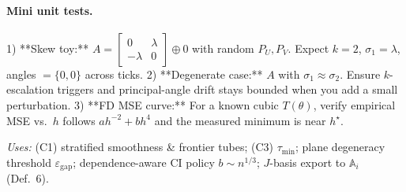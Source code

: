 \paragraph{Mini unit tests.}
1) **Skew toy:** \(A=\begin{bmatrix}0&\lambda\\-\lambda&0\end{bmatrix}\oplus 0\) with random \(P_U,P_V\). Expect \(k\!=\!2\), \(\sigma_1=\lambda\), angles \(=\{0,0\}\) across ticks.  
2) **Degenerate case:** \(A\) with \(\sigma_1\approx\sigma_2\). Ensure \(k\)-escalation triggers and principal-angle drift stays bounded when you add a small perturbation.  
3) **FD MSE curve:** For a known cubic \(T(\theta)\), verify empirical MSE vs.\ \(h\) follows \(a h^{-2} + b h^4\) and the measured minimum is near \(h^\star\).  

\emph{Uses: } (C1) stratified smoothness \& frontier tubes; (C3) \(\tau_{\min}\); plane degeneracy threshold \(\varepsilon_{\mathrm{gap}}\); dependence-aware CI policy \(b\sim n^{1/3}\); \(J\)-basis export to \(\mathbb A_i\) (Def.\ 6).


